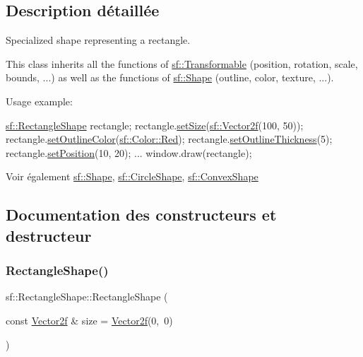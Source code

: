 \subsection{Description détaillée}
Specialized shape representing a rectangle. 

This class inherits all the functions of \hyperlink{classsf_1_1Transformable}{sf\+::\+Transformable} (position, rotation, scale, bounds, ...) as well as the functions of \hyperlink{classsf_1_1Shape}{sf\+::\+Shape} (outline, color, texture, ...).

Usage example\+: 
\begin{DoxyCode}
\hyperlink{classsf_1_1RectangleShape}{sf::RectangleShape} rectangle;
rectangle.\hyperlink{classsf_1_1RectangleShape_a5c65d374d4a259dfdc24efdd24a5dbec}{setSize}(\hyperlink{classsf_1_1Vector2}{sf::Vector2f}(100, 50));
rectangle.\hyperlink{classsf_1_1Shape_a5978f41ee349ac3c52942996dcb184f7}{setOutlineColor}(\hyperlink{classsf_1_1Color_a127dbf55db9c07d0fa8f4bfcbb97594a}{sf::Color::Red});
rectangle.\hyperlink{classsf_1_1Shape_a5ad336ad74fc1f567fce3b7e44cf87dc}{setOutlineThickness}(5);
rectangle.\hyperlink{classsf_1_1Transformable_a4dbfb1a7c80688b0b4c477d706550208}{setPosition}(10, 20);
...
window.draw(rectangle);
\end{DoxyCode}


\begin{DoxySeeAlso}{Voir également}
\hyperlink{classsf_1_1Shape}{sf\+::\+Shape}, \hyperlink{classsf_1_1CircleShape}{sf\+::\+Circle\+Shape}, \hyperlink{classsf_1_1ConvexShape}{sf\+::\+Convex\+Shape} 
\end{DoxySeeAlso}


\subsection{Documentation des constructeurs et destructeur}
\mbox{\label{classsf_1_1RectangleShape_a83a2be157ebee85c95ed491c3e78dd7c}} 
\subsubsection{\texorpdfstring{Rectangle\+Shape()}{RectangleShape()}}
{\footnotesize\ttfamily sf\+::\+Rectangle\+Shape\+::\+Rectangle\+Shape (\begin{DoxyParamCaption}\item[{const \hyperlink{classsf_1_1Vector2}{Vector2f} \&}]{size = {\ttfamily \hyperlink{classsf_1_1Vector2}{Vector2f}(0,~0)} }\end{DoxyParamCaption})\hspace{0.3cm}{\ttfamily [explicit]}}



